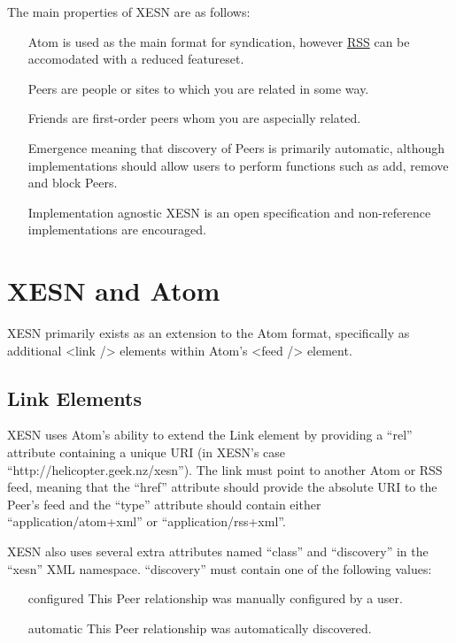 \documentclass[titlepage,english,a4paper,twoside,dvips]{article}
\begin{document}
The main properties of XESN are as follows:

\begin{itemize}

\item[Atom] is used as the main format for syndication, however \href{http://blogs.law.harvard.edu/tech/rss}{RSS} can be accomodated with a reduced featureset.

\item[Peers] are people or sites to which you are related in some way.

\item[Friends] are first-order peers whom you are aspecially related.

\item[Emergence] meaning that discovery of Peers is primarily automatic, although implementations should allow users to perform functions such as add, remove and block Peers.

\item[Implementation agnostic] XESN is an open specification and non-reference implementations are encouraged.

\end{itemize}

\clearpage

\section{XESN and Atom}

XESN primarily exists as an extension to the Atom format, specifically as additional <link /> elements within Atom's <feed /> element.

\subsection{Link Elements}

XESN uses Atom's ability to extend the Link element by providing a ``rel'' attribute containing a unique URI (in XESN's case ``http://helicopter.geek.nz/xesn'').  The link must point to another Atom or RSS feed, meaning that the ``href'' attribute should provide the absolute URI to the Peer's feed and the ``type'' attribute should contain either ``application/atom+xml'' or ``application/rss+xml''.

XESN also uses several extra attributes named ``class'' and ``discovery'' in the ``xesn'' XML namespace.  ``discovery'' must contain one of the following values:

\begin{itemize}

\item[configured] This Peer relationship was manually configured by a user.

\item[automatic] This Peer relationship was automatically discovered.

\end{itemize}
\end{document}
